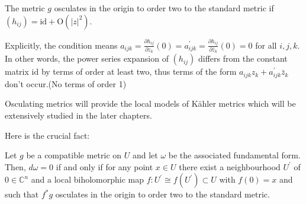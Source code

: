\begin{definition}
  The metric $g$ osculates in the origin to order two to the standard metric if $\left(h_{i j}\right)=\mathrm{id}+\mathrm{O}\left(|z|^2\right)$.
\end{definition}

Explicitly, the condition means $a_{i j k}=\frac{\partial h_{i j}}{\partial z_k}(0)=a_{i j k}^{\prime}=\frac{\partial h_{i j}}{\partial \bar{z}_k}(0)=0$ for all $i, j, k$. In other words, the power series expansion of $\left(h_{i j}\right)$ differs from the constant matrix $\mathrm{id}$ by terms of order at least two, thus terms of the form $a_{i j k} z_k+a_{i j k}^{\prime} \bar{z}_k$ don't occur.(No terms of order 1)

\begin{remark}
Osculating metrics will provide the local models of Kähler metrics which will be extensively studied in the later chapters. 
\end{remark}
Here is the crucial fact:
\begin{proposition}
  Let $g$ be a compatible metric on $U$ and let $\omega$ be the associated fundamental form. Then, $d \omega=0$ if and only if for any point $x \in U$ there exist a neighbourhood $U^{\prime}$ of $0 \in \mathbb{C}^n$ and a local biholomorphic map $f: U^{\prime} \cong f\left(U^{\prime}\right) \subset U$ with $f(0)=x$ and such that $f^* g$ osculates in the origin to order two to the standard metric.
\end{proposition}

